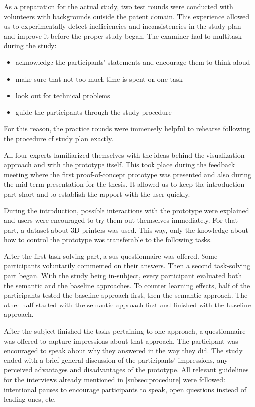 As a preparation for the actual study, two test rounds were conducted with volunteers with backgrounds outside the patent domain. 
This experience allowed us to experimentally detect inefficiencies and inconsistencies in the study plan and improve it before the proper study began.
The examiner had to multitask during the study:
\begin{itemize}
\item acknowledge the participants' statements and encourage them to think aloud
\item make sure that not too much time is spent on one task
\item look out for technical problems
\item guide the participants through the study procedure
\end{itemize}
For this reason, the practice rounds were immensely helpful to rehearse following the procedure of study plan exactly.

All four experts familiarized themselves with the ideas behind the visualization approach and with the prototype itself. 
This took place during the feedback meeting where the first proof-of-concept prototype was presented and also during the mid-term presentation for the thesis.
It allowed us to keep the introduction part short and to establish the rapport with the user quickly.

During the introduction, possible interactions with the prototype were explained and users were encouraged to try them out themselves immediately.
For that part, a dataset about 3D printers was used. 
This way, only the knowledge about how to control the prototype was transferable to the following tasks.

After the first task-solving part, a \gls{sus} questionnaire was offered. 
Some participants voluntarily commented on their answers.
Then a second task-solving part began.
With the study being in-subject, every participant evaluated both the semantic and the baseline approaches.
To counter learning effects, half of the participants tested the baseline approach first, then the semantic approach.
The other half started with the semantic approach first and finished with the baseline approach.

After the subject finished the tasks pertaining to one approach, a questionnaire was offered to capture impressions about that approach.
The participant was encouraged to speak about why they answered in the way they did.
The study ended with a brief general discussion of the participants' impressions, any perceived advantages and disadvantages of the prototype.
All relevant guidelines for the interviews already mentioned in \autoref{subsec:procedure} were followed: intentional pauses to encourage participants to speak, open questions instead of leading ones, etc.

